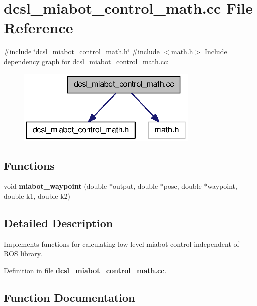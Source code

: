 \section{dcsl\-\_\-miabot\-\_\-control\-\_\-math.\-cc \-File \-Reference}
\label{dcsl__miabot__control__math_8cc}
{\ttfamily \#include \char`\"{}dcsl\-\_\-miabot\-\_\-control\-\_\-math.\-h\char`\"{}}\*
{\ttfamily \#include $<$math.\-h$>$}\*
\-Include dependency graph for dcsl\-\_\-miabot\-\_\-control\-\_\-math.\-cc\-:
\nopagebreak
\begin{figure}[H]
\begin{center}
\leavevmode
\includegraphics[width=246pt]{dcsl__miabot__control__math_8cc__incl}
\end{center}
\end{figure}
\subsection*{\-Functions}
\begin{DoxyCompactItemize}
\item 
void {\bf miabot\-\_\-waypoint} (double $\ast$output, double $\ast$pose, double $\ast$waypoint, double k1, double k2)
\end{DoxyCompactItemize}


\subsection{\-Detailed \-Description}
\-Implements functions for calculating low level miabot control independent of \-R\-O\-S library. 

\-Definition in file {\bf dcsl\-\_\-miabot\-\_\-control\-\_\-math.\-cc}.



\subsection{\-Function \-Documentation}

